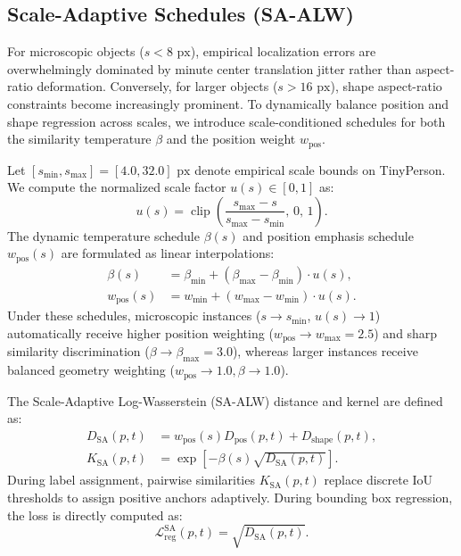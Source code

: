 \subsection{Scale-Adaptive Schedules (SA-ALW)}
\label{subsec:sa_alw}
For microscopic objects ($s < 8\text{ px}$), empirical localization errors are overwhelmingly dominated by minute center translation jitter rather than aspect-ratio deformation. Conversely, for larger objects ($s > 16\text{ px}$), shape aspect-ratio constraints become increasingly prominent. To dynamically balance position and shape regression across scales, we introduce scale-conditioned schedules for both the similarity temperature $\beta$ and the position weight $w_{\mathrm{pos}}$.

Let $[s_{\min}, s_{\max}] = [4.0, 32.0]\text{ px}$ denote empirical scale bounds on TinyPerson. We compute the normalized scale factor $u(s) \in [0, 1]$ as:
\begin{equation}
u(s) = \operatorname{clip}\left( \frac{s_{\max} - s}{s_{\max} - s_{\min}},\, 0,\, 1 \right).
\label{eq:scale_factor}
\end{equation}
The dynamic temperature schedule $\beta(s)$ and position emphasis schedule $w_{\mathrm{pos}}(s)$ are formulated as linear interpolations:
\begin{align}
\beta(s) &= \beta_{\min} + (\beta_{\max} - \beta_{\min}) \cdot u(s), \label{eq:beta_schedule} \\
w_{\mathrm{pos}}(s) &= w_{\min} + (w_{\max} - w_{\min}) \cdot u(s). \label{eq:w_pos_schedule}
\end{align}
Under these schedules, microscopic instances ($s \to s_{\min}$, $u(s) \to 1$) automatically receive higher position weighting ($w_{\mathrm{pos}} \to w_{\max} = 2.5$) and sharp similarity discrimination ($\beta \to \beta_{\max} = 3.0$), whereas larger instances receive balanced geometry weighting ($w_{\mathrm{pos}} \to 1.0, \beta \to 1.0$).

The Scale-Adaptive Log-Wasserstein (SA-ALW) distance and kernel are defined as:
\begin{align}
D_{\mathrm{SA}}(p, t) &= w_{\mathrm{pos}}(s) D_{\mathrm{pos}}(p, t) + D_{\mathrm{shape}}(p, t), \label{eq:d_sa} \\
K_{\mathrm{SA}}(p, t) &= \exp\left[ -\beta(s) \sqrt{D_{\mathrm{SA}}(p, t)} \right]. \label{eq:k_sa}
\end{align}
During label assignment, pairwise similarities $K_{\mathrm{SA}}(p, t)$ replace discrete IoU thresholds to assign positive anchors adaptively. During bounding box regression, the loss is directly computed as:
\begin{equation}
\mathcal{L}_{\mathrm{reg}}^{\mathrm{SA}}(p, t) = \sqrt{D_{\mathrm{SA}}(p, t)}.
\label{eq:l_reg_sa}
\end{equation}

